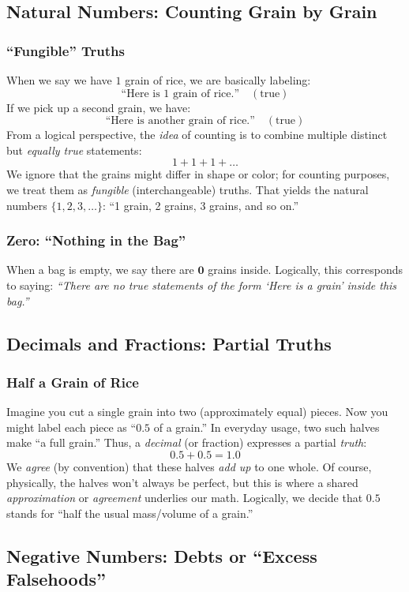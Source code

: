 \documentclass[12pt]{article}
\begin{document}
\subsection{Natural Numbers: Counting Grain by Grain}
\subsubsection{``Fungible'' Truths}
When we say we have $1$ grain of rice, we are basically labeling:
\[
\text{``Here is 1 grain of rice.''} \quad (\text{true})
\]
If we pick up a second grain, we have:
\[
\text{``Here is another grain of rice.''} \quad (\text{true})
\]
From a logical perspective, the \emph{idea} of counting is to combine
multiple distinct but \emph{equally true} statements:
\[
1 + 1 + 1 + \dots
\]
We ignore that the grains might differ in shape or color; for counting
purposes, we treat them as \emph{fungible} (interchangeable) truths.
That yields the natural numbers $\{1, 2, 3, \ldots\}$: 
``1 grain, 2 grains, 3 grains, and so on.''

\subsubsection{Zero: ``Nothing in the Bag''}
When a bag is empty, we say there are $\textbf{0}$ grains inside. Logically,
this corresponds to saying: \emph{``There are no true statements of the
form `Here is a grain' inside this bag.''}

\subsection{Decimals and Fractions: Partial Truths}
\subsubsection{Half a Grain of Rice}
Imagine you cut a single grain into two (approximately equal) pieces. Now
you might label each piece as ``$0.5$ of a grain.'' In everyday usage,
two such halves make ``a full grain.'' Thus, a \emph{decimal} (or fraction)
expresses a partial \emph{truth}:
\[
0.5 + 0.5 = 1.0
\]
We \emph{agree} (by convention) that these halves \emph{add up} to one
whole. Of course, physically, the halves won't always be perfect, but
this is where a shared \emph{approximation} or \emph{agreement} underlies
our math. Logically, we decide that $0.5$ stands for ``half the usual
mass/volume of a grain.''

\subsection{Negative Numbers: Debts or ``Excess Falsehoods''}
\end{document}
